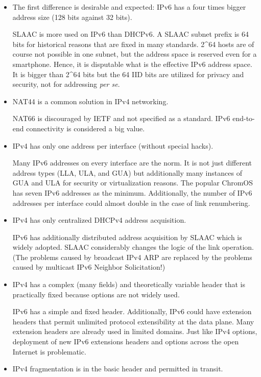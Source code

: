 \documentclass[
]{article}
\begin{document}
\begin{itemize}
\item
  The first difference is desirable and expected: IPv6 has a four times
  bigger address size (128 bits against 32 bits).

  SLAAC is more used on IPv6 than DHCPv6. A SLAAC subnet prefix is 64
  bits for historical reasons that are fixed in many standards. 2\^{}64
  hosts are of course not possible in one subnet, but the address space
  is reserved even for a smartphone. Hence, it is disputable what is the
  effective IPv6 address space. It is bigger than 2\^{}64 bits but the
  64 IID bits are utilized for privacy and security, not for addressing
  \emph{per se}.
\item
  NAT44 is a common solution in IPv4 networking.

  NAT66 is discouraged by IETF and not specified as a standard. IPv6
  end-to-end connectivity is considered a big value.
\item
  IPv4 has only one address per interface (without special hacks).

  Many IPv6 addresses on every interface are the norm. It is not just
  different address types (LLA, ULA, and GUA) but additionally many
  instances of GUA and ULA for security or virtualization reasons. The
  popular ChromOS has seven IPv6 addresses as the minimum. Additionally,
  the number of IPv6 addresses per interface could almost double in the
  case of link renumbering.
\item
  IPv4 has only centralized DHCPv4 address acquisition.

  IPv6 has additionally distributed address acquisition by SLAAC which
  is widely adopted. SLAAC considerably changes the logic of the link
  operation. (The problems caused by broadcast IPv4 ARP are replaced by
  the problems caused by multicast IPv6 Neighbor Solicitation!)
\item
  IPv4 has a complex (many fields) and theoretically variable header
  that is practically fixed because options are not widely used.

  IPv6 has a simple and fixed header. Additionally, IPv6 could have
  extension headers that permit unlimited protocol extensibility at the
  data plane. Many extension headers are already used in limited
  domains. Just like IPv4 options, deployment of new IPv6 extensions
  headers and options across the open Internet is problematic.
\item
  IPv4 fragmentation is in the basic header and permitted in transit.


\end{itemize}
\end{document}
